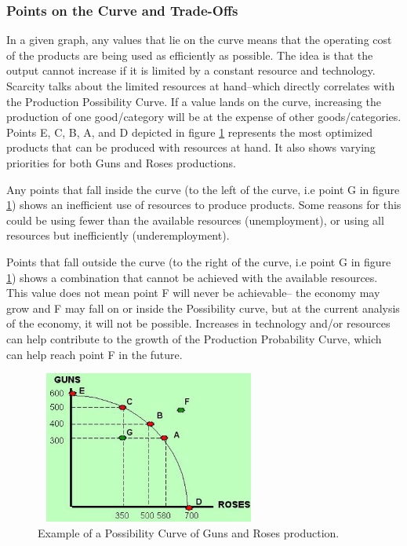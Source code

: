 \documentclass[a4paper, 12pt] {article}
\begin{document}
\subsubsection{Points on the Curve and Trade-Offs}
In a given graph, any values that lie on the curve means that the operating cost
of the products are being used as efficiently as possible. The idea is that the
output cannot increase if it is limited by a constant resource and technology.
Scarcity talks about the limited resources at hand--which directly correlates
with the Production Possibility Curve. If a value lands on the curve, increasing
the production of one good/category will be at the expense of other goods/categories.
Points E, C, B, A, and D depicted in figure \ref{fig:GnR1} represents the most
optimized products that can be produced with resources at hand. It also shows
varying priorities for both Guns and Roses productions.

Any points that fall inside the curve (to the left of the curve, i.e point G in
figure \ref{fig:GnR1}) shows an inefficient use of resources to produce products.
Some reasons for this could be using fewer than the available resources
(unemployment), or using all resources but inefficiently (underemployment).

Points that fall outside the curve (to the right of the curve, i.e point G in
figure \ref{fig:GnR1}) shows a combination that cannot be achieved with the
available resources. This value does not mean point F will never be achievable--
the economy may grow and F may fall on or inside the Possibility curve, but at
the current analysis of the economy, it will not be possible.
Increases in technology and/or resources can help contribute to the growth of
the Production Probability Curve, which can help reach point F in the future.

\begin{figure}
    \centering
    \includegraphics[width=7.5cm, height=5cm]{Production_Possibility_Curve.jpg}
    \caption{Example of a Possibility Curve of Guns and Roses production.}
    \label{fig:GnR1}
\end{figure}
\end{document}
